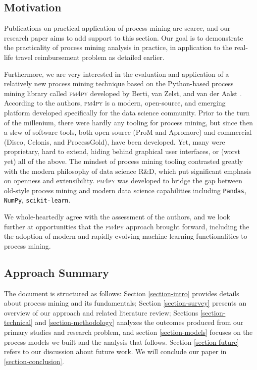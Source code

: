 \documentclass[conference]{IEEEtran}
\begin{document}
\subsection{Motivation}

Publications on practical application of process mining are scarce,
and our research paper aims to add support to this section. Our goal is
to demonstrate the practicality of process mining analysis
in practice, in application to the real-life travel reimbursement problem
as detailed earlier.

Furthermore, we are very interested in the evaluation and application
of a relatively new process mining technique based on
the Python-based process mining library called \textsc{pm4py}
developed by Berti, van Zelst, and van der Aalst \cite{BeZe2019}.
According to the authors,
\textsc{pm4py} is a modern, open-source, and emerging platform developed
specifically for the data science community. Prior to the turn of the
millenium,
there were hardly any tooling for process mining, but
since then a slew of software tools, both open-source
(ProM and Apromore) and commercial (Disco, Celonis, and ProcessGold),
have been developed. Yet, many were proprietary, hard to extend,
hiding behind graphical user interfaces, or (worst yet) all of the above.
The mindset of process mining
tooling contrasted greatly with the modern philosophy of data science R\&D,
which put significant emphasis on openness and extensibility.
\textsc{pm4py} was developed to bridge the gap
between old-style process mining and modern data science
capabilities including
\texttt{Pandas}, \texttt{NumPy}, \texttt{scikit-learn}.

We whole-heartedly
agree with the assessment of the authors, and we look further at opportunities
that the \textsc{pm4py} approach brought forward, including the
the adoption of modern and rapidly evolving machine learning
functionalities to process mining.


\subsection{Approach Summary}

The document is structured as follows: Section \ref{section-intro} provides details about
process mining and its fundamentals; Section \ref{section-survey} presents an overview of
our approach and related literature review; Sections \ref{section-technical}
and \ref{section-methodology} analyzes the
outcomes produced from our primary studies and research problem,
and section \ref{section-models} focuses on the process models we built
and the analysis that follows. Section \ref{section-future}
refers to our discussion about future work. We will conclude our paper
in \ref{section-conclusion}.
\end{document}
